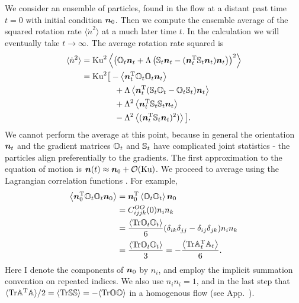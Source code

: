 \documentclass[thesis.tex]{subfiles}
\begin{document}
We consider an ensemble of particles, found in the flow at a distant past time $t=0$ with initial condition $\mbox{\boldmath$n$}_0$. Then we compute the ensemble average of the squared rotation rate $\langle \dot n^2\rangle$ at a much later time $t$.
In the calculation we will eventually take $t\to\infty$. The average rotation rate squared is
\begin{align}
	\langle \dot n^2\rangle &= \ku^2\left\langle\left(\ma O_{t}\ve n_{t}+\Lambda\left(\ma S_{t}\ve n_{t}-(\ve n_{t}\transpose\ma S_{t}\ve n_{t})\ve n_{t}\right)\right)^2\right\rangle\nn \nn\\
	&= \ku^2\big[-\left\langle\ve n_{t}\transpose \ma O_{t} \ma O_{t} \ve n_{t}\right\rangle \nn\\
	&\qquad\qquad+ \Lambda\left\langle\ve n_{t}\transpose(\ma S_{t}\ma O_{t} - \ma O_{t}\ma S_{t})\ve n_t\right\rangle \nn\\
	&\qquad\qquad+ \Lambda^2\left\langle\ve n_{t}\transpose\ma S_{t}\ma S_{t}\ve n_{t}\right\rangle \nn\\
	&\qquad\qquad-  \Lambda^2\left\langle(\ve n_{t}\transpose\ma S_{t}\ve n_{t})^2)\right\rangle\big].\eqnlab{ndotsquared}
\end{align}
We cannot perform the average at this point, because in general the orientation $\mbox{\boldmath$n$}_t$ and the gradient matrices $\mathbb{O}_t$ and $\mathbb{S}_t$ have complicated joint statistics - the particles align preferentially to the gradients. 
The first approximation to the equation of motion  is $\mbox{\boldmath$n$}(t) \approx \mbox{\boldmath$n$}_0 + \mathcal O(\mbox{Ku})$.
We proceed to average using the Lagrangian correlation functions . For example,
\begin{align*}
 	\left\langle\mbox{\boldmath$n$}_{0}^{\mathrm T} \mathbb{O}_{t} \mathbb{O}_{t} \mbox{\boldmath$n$}_{0}\right\rangle&=\mbox{\boldmath$n$}_{0}^{\mathrm T}\left\langle \mathbb{O}_{t} \mathbb{O}_{t} \right\rangle\mbox{\boldmath$n$}_{0} \\
 	&= C^{OO}_{ijjk}(0)n_in_k\\
 	&= \frac{\left\langle \mbox{Tr} \mathbb{O}_t\mathbb{O}_t\right\rangle}{6}( \delta_{ik}\delta_{jj}-\delta_{ij}\delta_{jk})n_in_k\\
 	&=\frac{\left\langle \mbox{Tr} \mathbb{O}_t\mathbb{O}_t\right\rangle}{3} = -\frac{\left\langle \mbox{Tr} \mathbb{A}_t^{\mathrm T}\mathbb{A}_t\right\rangle}{6}.
 \end{align*}
Here I denote the components of $\mbox{\boldmath$n$}_0$ by $n_i$, and employ the implicit summation convention on repeated indices. We also use $n_in_i=1$, and in the last step that $\langle\mbox{Tr}\mathbb{A}^{\mathrm T} \mathbb{A}\rangle/2=\langle\mbox{Tr}\mathbb{S}\mathbb{S}\rangle=-\langle\mbox{Tr}\mathbb{O}\mathbb{O}\rangle$ in a homogenous flow (see App.~).
\end{document}
